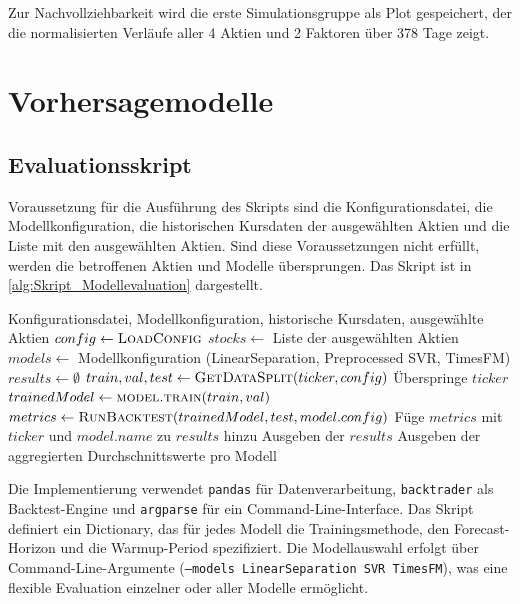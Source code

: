 Zur Nachvollziehbarkeit wird die erste Simulationsgruppe als Plot gespeichert, der die normalisierten Verläufe aller 4 Aktien und 2 Faktoren über 378 Tage zeigt.

\section{Vorhersagemodelle}\label{sec:impl_vorhersagemodelle}

\subsection{Evaluationsskript}\label{subsec:evaluationsskript}
Voraussetzung für die Ausführung des Skripts sind die Konfigurationsdatei, die Modellkonfiguration, die historischen Kursdaten der ausgewählten Aktien und die Liste mit den ausgewählten Aktien. Sind diese Voraussetzungen nicht erfüllt, werden die betroffenen Aktien und Modelle übersprungen. Das Skript ist in \cref{alg:Skript_Modellevaluation} dargestellt.
\begin{algorithm}
    \caption{Skript Modellevaluation}\label{alg:Skript_Modellevaluation}
    \small
    \begin{algorithmic}[1]
        \Require Konfigurationsdatei, Modellkonfiguration, historische Kursdaten, ausgewählte Aktien
        \State $config \gets \Call{LoadConfig}{}$
        \State $stocks \gets$ Liste der ausgewählten Aktien
        \State $models \gets$ Modellkonfiguration (LinearSeparation, Preprocessed SVR, TimesFM)
        \State $results \gets \emptyset$
        \State $train, val, test \gets \Call{GetDataSplit}{ticker, config}$ 
        \State Überspringe $ticker$
        \EndIf
        \State $trainedModel \gets \Call{model.train}{train, val}$
        \State $metrics \gets \Call{RunBacktest}{trainedModel, test, model.config}$
        \State Füge $metrics$ mit $ticker$ und $model.name$ zu $results$ hinzu
        \EndFor
        \EndFor
        \State Ausgeben der $results$
        \State Ausgeben der aggregierten Durchschnittswerte pro Modell
    \end{algorithmic}
\end{algorithm}
Die Implementierung verwendet \texttt{pandas} für Datenverarbeitung, \texttt{backtrader} als Backtest-Engine und \texttt{argparse} für ein Command-Line-Interface. Das Skript definiert ein Dictionary, das für jedes Modell die Trainingsmethode, den Forecast-Horizon und die Warmup-Period spezifiziert. Die Modellauswahl erfolgt über Command-Line-Argumente (\texttt{--models LinearSeparation SVR TimesFM}), was eine flexible Evaluation einzelner oder aller Modelle ermöglicht.


